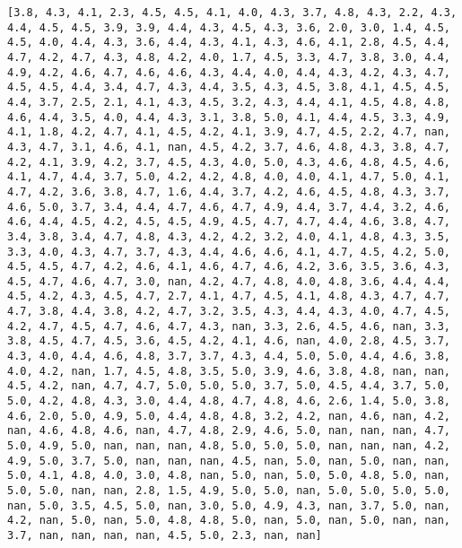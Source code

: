 \documentclass[11pt]{article}
\begin{document}
\begin{Verbatim}[commandchars=\\\{\}]
[3.8, 4.3, 4.1, 2.3, 4.5, 4.5, 4.1, 4.0, 4.3, 3.7, 4.8, 4.3, 2.2, 4.3, 4.4, 4.5, 4.5, 3.9, 3.9, 4.4, 4.3, 4.5, 4.3, 3.6, 2.0, 3.0, 1.4, 4.5, 4.5, 4.0, 4.4, 4.3, 3.6, 4.4, 4.3, 4.1, 4.3, 4.6, 4.1, 2.8, 4.5, 4.4, 4.7, 4.2, 4.7, 4.3, 4.8, 4.2, 4.0, 1.7, 4.5, 3.3, 4.7, 3.8, 3.0, 4.4, 4.9, 4.2, 4.6, 4.7, 4.6, 4.6, 4.3, 4.4, 4.0, 4.4, 4.3, 4.2, 4.3, 4.7, 4.5, 4.5, 4.4, 3.4, 4.7, 4.3, 4.4, 3.5, 4.3, 4.5, 3.8, 4.1, 4.5, 4.5, 4.4, 3.7, 2.5, 2.1, 4.1, 4.3, 4.5, 3.2, 4.3, 4.4, 4.1, 4.5, 4.8, 4.8, 4.6, 4.4, 3.5, 4.0, 4.4, 4.3, 3.1, 3.8, 5.0, 4.1, 4.4, 4.5, 3.3, 4.9, 4.1, 1.8, 4.2, 4.7, 4.1, 4.5, 4.2, 4.1, 3.9, 4.7, 4.5, 2.2, 4.7, nan, 4.3, 4.7, 3.1, 4.6, 4.1, nan, 4.5, 4.2, 3.7, 4.6, 4.8, 4.3, 3.8, 4.7, 4.2, 4.1, 3.9, 4.2, 3.7, 4.5, 4.3, 4.0, 5.0, 4.3, 4.6, 4.8, 4.5, 4.6, 4.1, 4.7, 4.4, 3.7, 5.0, 4.2, 4.2, 4.8, 4.0, 4.0, 4.1, 4.7, 5.0, 4.1, 4.7, 4.2, 3.6, 3.8, 4.7, 1.6, 4.4, 3.7, 4.2, 4.6, 4.5, 4.8, 4.3, 3.7, 4.6, 5.0, 3.7, 3.4, 4.4, 4.7, 4.6, 4.7, 4.9, 4.4, 3.7, 4.4, 3.2, 4.6, 4.6, 4.4, 4.5, 4.2, 4.5, 4.5, 4.9, 4.5, 4.7, 4.7, 4.4, 4.6, 3.8, 4.7, 3.4, 3.8, 3.4, 4.7, 4.8, 4.3, 4.2, 4.2, 3.2, 4.0, 4.1, 4.8, 4.3, 3.5, 3.3, 4.0, 4.3, 4.7, 3.7, 4.3, 4.4, 4.6, 4.6, 4.1, 4.7, 4.5, 4.2, 5.0, 4.5, 4.5, 4.7, 4.2, 4.6, 4.1, 4.6, 4.7, 4.6, 4.2, 3.6, 3.5, 3.6, 4.3, 4.5, 4.7, 4.6, 4.7, 3.0, nan, 4.2, 4.7, 4.8, 4.0, 4.8, 3.6, 4.4, 4.4, 4.5, 4.2, 4.3, 4.5, 4.7, 2.7, 4.1, 4.7, 4.5, 4.1, 4.8, 4.3, 4.7, 4.7, 4.7, 3.8, 4.4, 3.8, 4.2, 4.7, 3.2, 3.5, 4.3, 4.4, 4.3, 4.0, 4.7, 4.5, 4.2, 4.7, 4.5, 4.7, 4.6, 4.7, 4.3, nan, 3.3, 2.6, 4.5, 4.6, nan, 3.3, 3.8, 4.5, 4.7, 4.5, 3.6, 4.5, 4.2, 4.1, 4.6, nan, 4.0, 2.8, 4.5, 3.7, 4.3, 4.0, 4.4, 4.6, 4.8, 3.7, 3.7, 4.3, 4.4, 5.0, 5.0, 4.4, 4.6, 3.8, 4.0, 4.2, nan, 1.7, 4.5, 4.8, 3.5, 5.0, 3.9, 4.6, 3.8, 4.8, nan, nan, 4.5, 4.2, nan, 4.7, 4.7, 5.0, 5.0, 5.0, 3.7, 5.0, 4.5, 4.4, 3.7, 5.0, 5.0, 4.2, 4.8, 4.3, 3.0, 4.4, 4.8, 4.7, 4.8, 4.6, 2.6, 1.4, 5.0, 3.8, 4.6, 2.0, 5.0, 4.9, 5.0, 4.4, 4.8, 4.8, 3.2, 4.2, nan, 4.6, nan, 4.2, nan, 4.6, 4.8, 4.6, nan, 4.7, 4.8, 2.9, 4.6, 5.0, nan, nan, nan, 4.7, 5.0, 4.9, 5.0, nan, nan, nan, 4.8, 5.0, 5.0, 5.0, nan, nan, nan, 4.2, 4.9, 5.0, 3.7, 5.0, nan, nan, nan, 4.5, nan, 5.0, nan, 5.0, nan, nan, 5.0, 4.1, 4.8, 4.0, 3.0, 4.8, nan, 5.0, nan, 5.0, 5.0, 4.8, 5.0, nan, 5.0, 5.0, nan, nan, 2.8, 1.5, 4.9, 5.0, 5.0, nan, 5.0, 5.0, 5.0, 5.0, nan, 5.0, 3.5, 4.5, 5.0, nan, 3.0, 5.0, 4.9, 4.3, nan, 3.7, 5.0, nan, 4.2, nan, 5.0, nan, 5.0, 4.8, 4.8, 5.0, nan, 5.0, nan, 5.0, nan, nan, 3.7, nan, nan, nan, nan, 4.5, 5.0, 2.3, nan, nan]

    \end{Verbatim}
\end{document}
